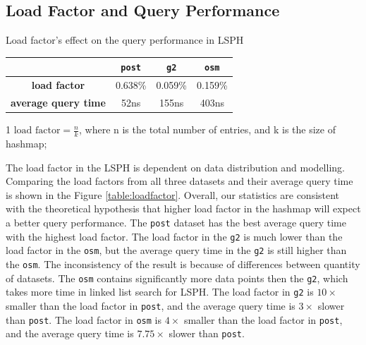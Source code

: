 \subsection{Load Factor and Query Performance}

\begin{center}
\begin{adjustbox}{max width={\textwidth}, max totalheight={\textheight},keepaspectratio}
\begin{threeparttable}
\caption{Load factor's effect on the query performance in LSPH}
\begin{tabular}{c|c c c}
    \toprule
                                    &\texttt{post}      & \texttt{g2} & \texttt{osm}             \\ \midrule 
    \textbf{load factor}\tnote{1}            & 0.638\%   & 0.059\%   & 0.159\% \\
    \textbf{average query time}     & 52ns      & 155ns     & 403ns   \\
    \bottomrule
\end{tabular}
\begin{tablenotes}
\item[1] $\text{load factor} = \frac{n}{k}$, where n is the total number of entries, and k is the size of hashmap;
\end{tablenotes}
\end{threeparttable}
\label{table:loadfactor}
\end{adjustbox}
\end{center}

The load factor in the LSPH is dependent on data distribution and modelling. Comparing the load factors from all three datasets and their average query time is shown in the Figure \ref{table:loadfactor}. Overall, our statistics are consistent with the theoretical hypothesis that higher load factor in the hashmap will expect a better query performance. The \texttt{post} dataset has the best average query time with the highest load factor. The load factor in the \texttt{g2} is much lower than the load factor in the \texttt{osm}, but the average query time in the \texttt{g2} is still higher than the \texttt{osm}. The inconsistency of the result is because of differences between quantity of datasets. The \texttt{osm} contains significantly more data points then the \texttt{g2}, which takes more time in linked list search for LSPH. The load factor in \texttt{g2} is $10\times$ smaller than the load factor in \texttt{post}, and the average query time is $3\times$ slower than \texttt{post}. The load factor in \texttt{osm} is $4\times$ smaller than the load factor in \texttt{post}, and the average query time is $7.75\times$ slower than \texttt{post}.


